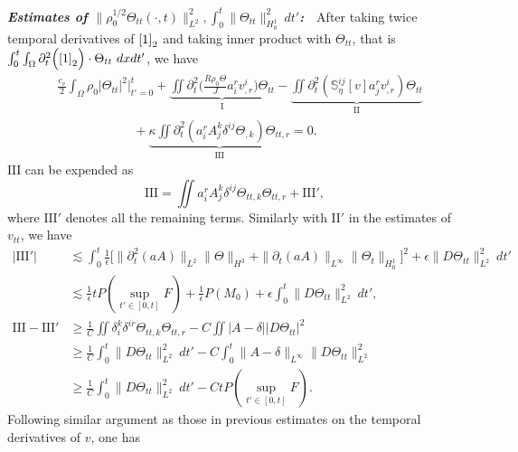\documentclass[12pt,a4paper]{amsart}
\numberwithin{equation}{section}
\theoremstyle{plain}
\theoremstyle{definition}
\begin{document}
\vspace{0.3cm}
\textsl{\textbf{Estimates of $\|\rho_0^{1/2}\Theta_{tt}(\cdot,t)\|_{L^2}^2, \int_{0}^{t}\|\Theta_{tt}\|_{H_0^1}^2 \ dt'$:}}~~After taking twice temporal derivatives of $\eqref{1}_2$ and taking inner product with $\Theta_{tt}$, that is $\int_{0}^{t}\int_{\Omega}\partial_t^2 \Big(\eqref{1}_2\Big)\cdot  \Theta_{tt}\ dx dt'$, we have
\begin{align*}
&\frac{c_v}{2}\int_{\Omega} \rho_0 |\Theta_{tt}|^2 \bigg|_{t'=0}^{t}  
+\underbrace{\iint  \partial_t^2 \Big(\frac{R\rho_0\Theta}{J} a^r_i v^i_{,r}\Big) \Theta_{tt}}_{\mathrm{I}}
-\underbrace{\iint \partial_t^2 (\mathbb{S}^{ij}_{\eta}[v] a^r_j v^i_{,r}) \Theta_{tt}}_{\mathrm{II}}\\
&\qquad\qquad\qquad
+\underbrace{\kappa\iint \partial_t^2 (a^r_i A^k_j \delta^{ij}\Theta_{,k}) \Theta_{tt,r}}_{\mathrm{III}}=0.
\end{align*}
$\mathrm{III}$ can be expended as 
$$
\mathrm{III}=\iint a^r_i A^{k}_j \delta^{ij}  \Theta_{tt,k}\Theta_{tt,r}+\mathrm{III}',
$$
where $\mathrm{III}'$ denotes all the remaining terms.
Similarly with $\mathrm{II}'$ in the estimates of $v_{tt}$, we have
\begin{align*}
|\mathrm{III}'|
&\lesssim \int_{0}^{t}\frac{1}{\epsilon}
   \Big[\|\partial_t^2(aA)\|_{L^2} \|\Theta\|_{H^3}
      +\|\partial_t (aA)\|_{L^{\infty}} \|\Theta_t\|_{H_0^1}\big]^2
   +\epsilon \|D\Theta_{tt}\|_{L^2}^2\ dt'\\
&\lesssim \frac{1}{\epsilon} tP(\sup\limits_{t'\in[0,t]} F)+\frac{1}{\epsilon}P(M_0)
   + \epsilon\int_{0}^{t} \|D\Theta_{tt}\|_{L^2}^2\ dt',\\
\mathrm{III}-\mathrm{III}'&\geq \frac{1}{C}\iint \delta_i^k \delta^{ir} \Theta_{tt,k}\Theta_{tt,r}
    -C\iint |A-\delta||D\Theta_{tt}|^2\\
&\geq \frac{1}{C} \int_{0}^{t} \|D\Theta_{tt}\|_{L^2}^2 \ dt'
    -C \int_{0}^{t}  \|A-\delta\|_{L^{\infty}}\|D\Theta_{tt}\|_{L^2}^2\\
&\geq \frac{1}{C} \int_{0}^{t} \|D\Theta_{tt}\|_{L^2}^2 \ dt'-CtP(\sup\limits_{t'\in[0,t]}F).
\end{align*}
Following similar argument as those in previous estimates on the temporal derivatives of $v$, one has
\end{document}
